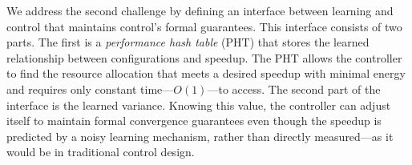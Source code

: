 {We address the second challenge by defining an interface between
learning and control that maintains control's formal guarantees.  This
interface consists of two parts.  The first is a \emph{performance
  hash table} (PHT) that stores the learned relationship between
configurations and speedup.  The PHT allows the controller to find the
resource allocation that meets a desired speedup with minimal energy
and requires only constant time---$O(1)$---to access.  The second part
of the interface is the learned variance.  Knowing this value, the
controller can adjust itself to maintain formal convergence guarantees
even though the speedup is predicted by a noisy learning mechanism,
rather than directly measured---as it would be in traditional control
design.
  }

